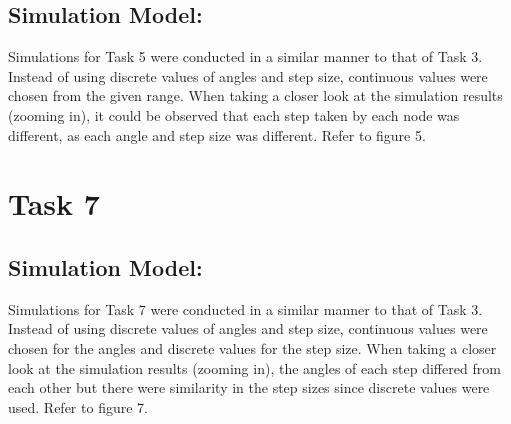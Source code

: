 \documentclass[8pt]{extarticle}
\begin{document}
\subsection*{Simulation Model:}
Simulations for Task 5 were conducted in a similar manner to that of Task 3. Instead of using discrete values of angles and step size, continuous values were chosen from the given range. When taking a closer look at the simulation results (zooming in), it could be observed that each step taken by each node was different, as each angle and step size was different. 
Refer to figure 5.


\section*{Task 7}
\subsection*{Simulation Model:}
Simulations for Task 7 were conducted in a similar manner to that of Task 3. Instead of using discrete values of angles and step size, continuous values were chosen for the angles and discrete values for the step size. When taking a closer look at the simulation results (zooming in), the angles of each step differed from each other but there were similarity in the step sizes since discrete values were used.
Refer to figure 7.
\end{document}
